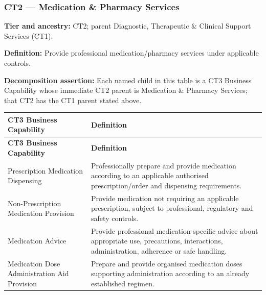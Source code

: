 \label{rad:business:477}
\subsubsection*{CT2 — Medication \& Pharmacy Services}
\label{rad:business:479}

\textbf{Tier and ancestry:} CT2; parent Diagnostic, Therapeutic \& Clinical Support Services (CT1).

\label{rad:business:481}

\textbf{Definition:} Provide professional medication/\allowbreak{}pharmacy services under applicable controls.

\label{rad:business:483}

\textbf{Decomposition assertion:} Each named child in this table is a CT3 Business Capability whose immediate CT2 parent is Medication \& Pharmacy Services; that CT2 has the CT1 parent stated above.

\label{rad:business:485}
\begingroup\small\setlength{\TableWidth}{\dimexpr\linewidth-4\tabcolsep-3\arrayrulewidth\relax}
\begin{longtable}{|>{\raggedright\arraybackslash}p{0.35\TableWidth}|>{\raggedright\arraybackslash}p{0.65\TableWidth}|}
\hline\rowcolor{TableHead}\textbf{CT3 Business Capability} & \textbf{Definition}\\\hline\endfirsthead
\hline\rowcolor{TableHead}\textbf{CT3 Business Capability} & \textbf{Definition}\\\hline\endhead
\hline\endfoot
Prescription Medication Dispensing & Professionally prepare and provide medication according to an applicable authorised prescription/\allowbreak{}order and dispensing requirements.\\\hline
Non-Prescription Medication Provision & Provide medication not requiring an applicable prescription, subject to professional, regulatory and safety controls.\\\hline
Medication Advice & Provide professional medication-specific advice about appropriate use, precautions, interactions, administration, adherence or safe handling.\\\hline
Medication Dose Administration Aid Provision & Prepare and provide organised medication doses supporting administration according to an already established regimen.\\\hline
\end{longtable}\endgroup
{}\label{rad:business:492}


